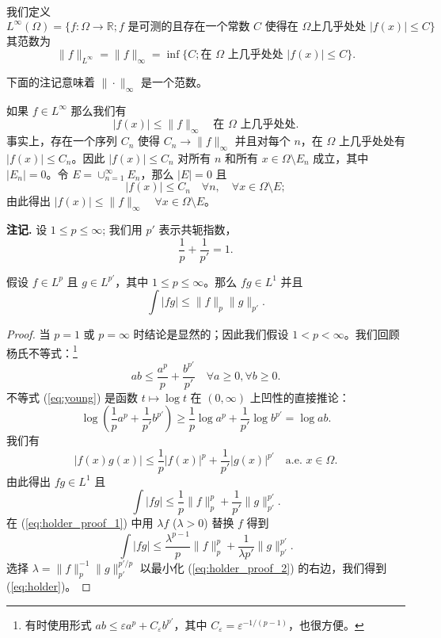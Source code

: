 \begin{definition}
我们定义
\[ L^\infty(\Omega) = \{f: \Omega \to \mathbb{R}; f \text{ 是可测的且存在一个常数 } C \text{ 使得在 } \Omega \text{上几乎处处 } |f(x)| \le C \} \]
其范数为
\[ \|f\|_{L^\infty} = \|f\|_\infty = \inf\{C; \text{在 } \Omega \text{ 上几乎处处 } |f(x)| \le C \}. \]
\end{definition}
下面的注记意味着 $\| \cdot \|_\infty$ 是一个范数。
\begin{remark}
如果 $f \in L^\infty$ 那么我们有
\[ |f(x)| \le \|f\|_\infty \quad \text{在 } \Omega \text{ 上几乎处处}. \]
事实上，存在一个序列 $C_n$ 使得 $C_n \to \|f\|_\infty$ 并且对每个 $n$，在 $\Omega$ 上几乎处处有 $|f(x)| \le C_n$。因此 $|f(x)| \le C_n$ 对所有 $n$ 和所有 $x \in \Omega \setminus E_n$ 成立，其中 $|E_n|=0$。令 $E = \cup_{n=1}^\infty E_n$，那么 $|E|=0$ 且
\[ |f(x)| \le C_n \quad \forall n, \quad \forall x \in \Omega \setminus E; \]
由此得出 $|f(x)| \le \|f\|_\infty \quad \forall x \in \Omega \setminus E$。
\end{remark}

\textbf{注记.} 设 $1 \le p \le \infty$; 我们用 $p'$ 表示共轭指数，
\[ \frac{1}{p} + \frac{1}{p'} = 1. \]

\begin{theorem}\label{theorem4.6}
假设 $f \in L^p$ 且 $g \in L^{p'}$，其中 $1 \le p \le \infty$。那么 $fg \in L^1$ 并且
\begin{equation}\label{eq:holder}
\int |fg| \le \|f\|_p \|g\|_{p'}.
\end{equation}
\end{theorem}

\begin{proof}
当 $p=1$ 或 $p=\infty$ 时结论是显然的；因此我们假设 $1 < p < \infty$。我们回顾杨氏不等式：\footnote{有时使用形式 $ab \le \varepsilon a^p + C_\varepsilon b^{p'}$，其中 $C_\varepsilon = \varepsilon^{-1/(p-1)}$，也很方便。}
\begin{equation}\label{eq:young}
ab \le \frac{a^p}{p} + \frac{b^{p'}}{p'} \quad \forall a \ge 0, \forall b \ge 0.
\end{equation}
不等式 (\ref{eq:young}) 是函数 $t \mapsto \log t$ 在 $(0, \infty)$ 上凹性的直接推论：
\[ \log\left(\frac{1}{p}a^p + \frac{1}{p'}b^{p'}\right) \ge \frac{1}{p}\log a^p + \frac{1}{p'}\log b^{p'} = \log ab. \]
我们有
\[ |f(x)g(x)| \le \frac{1}{p}|f(x)|^p + \frac{1}{p'}|g(x)|^{p'} \quad \text{a.e. } x \in \Omega. \]
由此得出 $fg \in L^1$ 且
\begin{equation}\label{eq:holder_proof_1}
\int |fg| \le \frac{1}{p}\|f\|_p^p + \frac{1}{p'}\|g\|_{p'}^{p'}.
\end{equation}
在 (\ref{eq:holder_proof_1}) 中用 $\lambda f$ ($\lambda > 0$) 替换 $f$ 得到
\begin{equation}\label{eq:holder_proof_2}
\int |fg| \le \frac{\lambda^{p-1}}{p}\|f\|_p^p + \frac{1}{\lambda p'}\|g\|_{p'}^{p'}.
\end{equation}
选择 $\lambda = \|f\|_p^{-1} \|g\|_{p'}^{p'/p}$ 以最小化 (\ref{eq:holder_proof_2}) 的右边，我们得到 (\ref{eq:holder})。
\end{proof}

